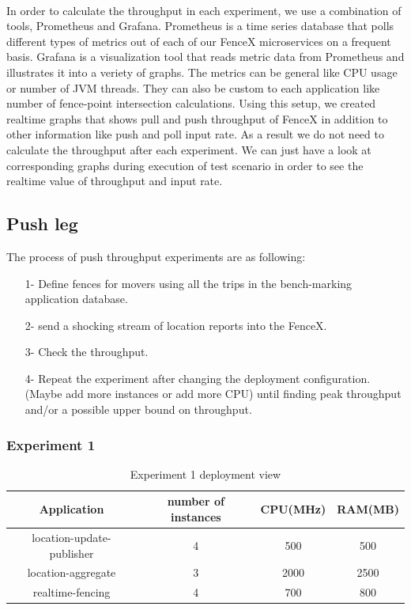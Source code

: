 \documentclass[a4]{report}
\begin{document}
    \paragraph{}
    In order to calculate the throughput in each experiment, we use a combination of tools, Prometheus and
    Grafana\cite{grafana}.
    Prometheus is a time series database that polls different types of metrics out of each of our FenceX
    microservices on a frequent basis.
    Grafana is a visualization tool that reads metric data from Prometheus and illustrates it into a veriety of graphs.
    The metrics can be general like CPU usage or number of JVM threads.
    They can also be custom to each application like number of fence-point intersection calculations.
    Using this setup, we created realtime graphs that shows pull and push throughput of FenceX in addition to other
    information like push and poll input rate.
    As a result we do not need to calculate the throughput after each experiment.
    We can just have a look at corresponding graphs during execution of test scenario in order to see the realtime
    value of throughput and input rate.

    \subsection{Push leg}
    The process of push throughput experiments are as following:
    \begin{itemize}
        \item[1-] Define fences for movers using all the trips in the bench-marking application database.
        \item[2-] send a shocking stream of location reports into the FenceX.
        \item[3-] Check the throughput.
        \item[4-] Repeat the experiment after changing the deployment configuration. (Maybe add more instances or add
        more CPU) until finding peak throughput and/or a possible upper bound on throughput.
    \end{itemize}

    \subsubsection{Experiment 1}
    \begin{table}[h!]
        \centering
        \begin{tabular}{|c|c|c|c|}
            \hline
            Application               & number of instances & CPU(MHz) & RAM(MB) \\
            \hline
            location-update-publisher & 4                   & 500      & 500     \\
            location-aggregate        & 3                   & 2000     & 2500    \\
            realtime-fencing          & 4                   & 700      & 800     \\
            \hline
        \end{tabular}
        \caption{Experiment 1 deployment view}
        \label{table:ex1-dv}
    \end{table}
\end{document}
